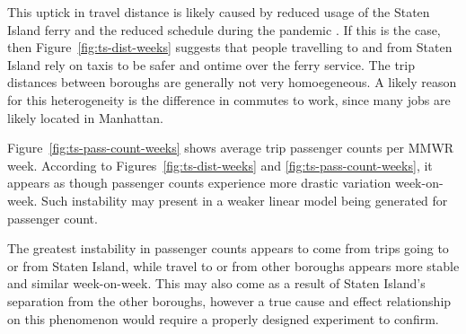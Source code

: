 \documentclass[11pt]{article}
\begin{document}
This uptick in travel distance is likely caused by reduced usage of the Staten Island ferry and the reduced schedule during the pandemic \cite{dot2020}.
If this is the case, then Figure~\ref{fig:ts-dist-weeks} suggests that people travelling to and from Staten Island rely on taxis to be safer and ontime over the ferry service.
The trip distances between boroughs are generally not very homoegeneous. 
A likely reason for this heterogeneity is the difference in commutes to work, since
many jobs are likely located in Manhattan.

Figure~\ref{fig:ts-pass-count-weeks} shows average trip passenger counts per MMWR week.
According to Figures~\ref{fig:ts-dist-weeks} and \ref{fig:ts-pass-count-weeks}, 
it appears as though passenger counts experience more drastic variation week-on-week.
Such instability may present in a weaker linear model being generated for passenger count.




The greatest instability in passenger counts appears to come from trips going to or from Staten Island,
while travel to or from other boroughs appears more stable and similar week-on-week. 
This may also come as a result of Staten Island's separation from the other boroughs,
however a true cause and effect relationship on this phenomenon would require a properly designed experiment to confirm.
\end{document}
